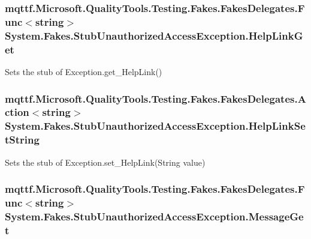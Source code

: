\hypertarget{class_system_1_1_fakes_1_1_stub_unauthorized_access_exception_aec6b220622273c722a11cb1be224ade6}{
\subsubsection[{Help\-Link\-Get}]{\setlength{\rightskip}{0pt plus 5cm}mqttf.\-Microsoft.\-Quality\-Tools.\-Testing.\-Fakes.\-Fakes\-Delegates.\-Func$<$string$>$ System.\-Fakes.\-Stub\-Unauthorized\-Access\-Exception.\-Help\-Link\-Get}}\label{class_system_1_1_fakes_1_1_stub_unauthorized_access_exception_aec6b220622273c722a11cb1be224ade6}


Sets the stub of Exception.\-get\-\_\-\-Help\-Link()

\hypertarget{class_system_1_1_fakes_1_1_stub_unauthorized_access_exception_a79829e8d8c4109120d6c7a3246dea104}{
\subsubsection[{Help\-Link\-Set\-String}]{\setlength{\rightskip}{0pt plus 5cm}mqttf.\-Microsoft.\-Quality\-Tools.\-Testing.\-Fakes.\-Fakes\-Delegates.\-Action$<$string$>$ System.\-Fakes.\-Stub\-Unauthorized\-Access\-Exception.\-Help\-Link\-Set\-String}}\label{class_system_1_1_fakes_1_1_stub_unauthorized_access_exception_a79829e8d8c4109120d6c7a3246dea104}


Sets the stub of Exception.\-set\-\_\-\-Help\-Link(\-String value)

\hypertarget{class_system_1_1_fakes_1_1_stub_unauthorized_access_exception_a9e36eb8ca3b1ab2027c3fa2b1b238167}{
\subsubsection[{Message\-Get}]{\setlength{\rightskip}{0pt plus 5cm}mqttf.\-Microsoft.\-Quality\-Tools.\-Testing.\-Fakes.\-Fakes\-Delegates.\-Func$<$string$>$ System.\-Fakes.\-Stub\-Unauthorized\-Access\-Exception.\-Message\-Get}}\label{class_system_1_1_fakes_1_1_stub_unauthorized_access_exception_a9e36eb8ca3b1ab2027c3fa2b1b238167}


